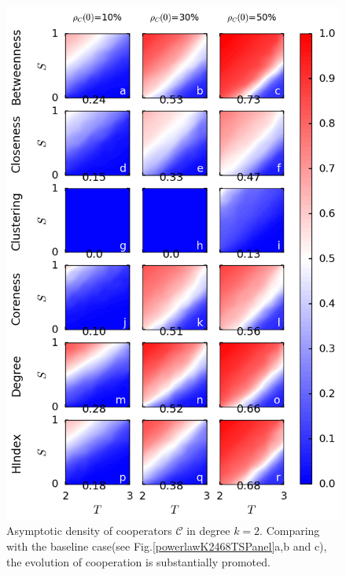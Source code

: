 \documentclass[preprint,12pt,3p]{elsarticle}
\begin{document}
\begin{figure}[htbp]
\centering
\includegraphics[width=13cm]{PowerlawK2TopRankTSPanel.png}

\caption{Asymptotic density of cooperators $\mathcal{C}$ in degree $k=2$.
Comparing with the baseline case(see Fig.\ref{powerlawK2468TSPanel}a,b and c),
the evolution of cooperation is substantially promoted.
}
\label{PowerlawK2TopRankTSPanel}
\end{figure}
\end{document}
